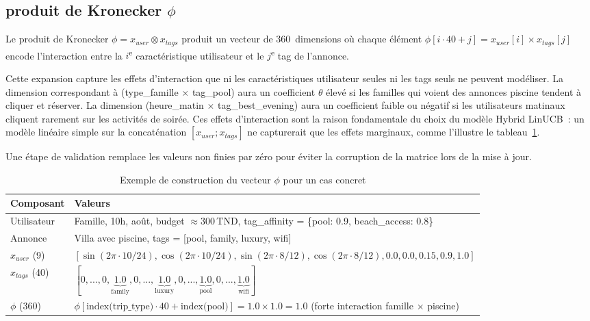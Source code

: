 \subsection{produit de Kronecker $\phi$}

Le produit de Kronecker $\phi = x_{user} \otimes x_{tags}$ produit un vecteur de
360~dimensions où chaque élément $\phi[i \cdot 40 + j] = x_{user}[i] \times
x_{tags}[j]$ encode l'interaction entre la $i$\textsuperscript{e} caractéristique utilisateur
et le $j$\textsuperscript{e} tag de l'annonce.

Cette expansion capture les effets d'interaction que ni les caractéristiques utilisateur
seules ni les tags seuls ne peuvent modéliser. La dimension correspondant à
(type\_famille $\times$ tag\_pool) aura un coefficient $\theta$ élevé si les familles qui
voient des annonces piscine tendent à cliquer et réserver. La dimension
(heure\_matin $\times$ tag\_best\_evening) aura un coefficient faible ou négatif si les
utilisateurs matinaux cliquent rarement sur les activités de soirée. Ces effets d'interaction
sont la raison fondamentale du choix du modèle Hybrid LinUCB~: un modèle linéaire simple
sur la concaténation $[x_{user}; x_{tags}]$ ne capturerait que les effets marginaux, comme l'illustre le tableau~\ref{tab:phi_example}.

Une étape de validation remplace les valeurs non finies par zéro pour éviter la corruption de la matrice lors de 
la mise à jour.

\begin{table}[H]
    \centering
    \caption{Exemple de construction du vecteur $\phi$ pour un cas concret}
    \label{tab:phi_example}
    \small
    \begin{tabular}{p{2.5cm} p{11cm}}
        \toprule
        \textbf{Composant} & \textbf{Valeurs} \\
        \midrule
        Utilisateur & Famille, 10h, août, budget $\approx 300$\,TND,
                       tag\_affinity = \{pool: 0.9, beach\_access: 0.8\} \\[3pt]
        Annonce & Villa avec piscine, tags = [pool, family, luxury, wifi] \\[3pt]
        $x_{user}$ (9) & $[\sin(2\pi\cdot10/24), \cos(2\pi\cdot10/24),
                    \sin(2\pi\cdot8/12), \cos(2\pi\cdot8/12),
                    0.0, 0.0, 0.15, 0.9, 1.0]$ \\[3pt]
        $x_{tags}$ (40) & $[0,...,0, \underbrace{1.0}_{\text{family}},
                    0,..., \underbrace{1.0}_{\text{luxury}}, 0,...,
                    \underbrace{1.0}_{\text{pool}}, 0,...,
                    \underbrace{1.0}_{\text{wifi}}]$ \\[3pt]
        $\phi$ (360) & $\phi[\text{index(trip\_type)} \cdot 40 + \text{index(pool)}]
                    = 1.0 \times 1.0 = 1.0$ (forte interaction
                    famille $\times$ piscine) \\
        \bottomrule
    \end{tabular}
\end{table}


